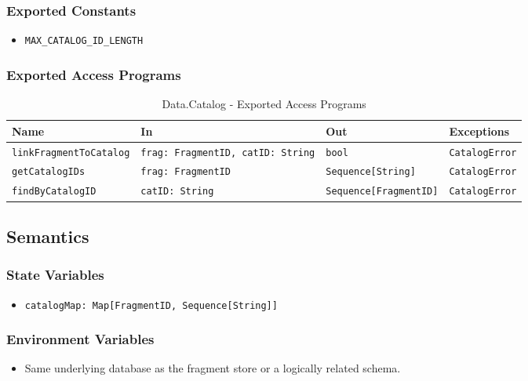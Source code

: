 \documentclass[12pt, titlepage]{article}
\begin{document}
\subsubsection{Exported Constants}
\begin{itemize}
    \item \texttt{MAX\_CATALOG\_ID\_LENGTH}
\end{itemize}

\subsubsection{Exported Access Programs}

\begin{table}[H]
\centering
\small
\caption{Data.Catalog - Exported Access Programs}
\begin{tabular}{p{4.2cm} p{3.8cm} p{3.5cm} p{2.5cm}}
\toprule
\textbf{Name} & \textbf{In} & \textbf{Out} & \textbf{Exceptions} \\
\midrule
\texttt{linkFragmentToCatalog} & \texttt{frag: FragmentID, catID: String} & \texttt{bool} & \texttt{CatalogError} \\
\texttt{getCatalogIDs} & \texttt{frag: FragmentID} & \texttt{Sequence[String]} & \texttt{CatalogError} \\
\texttt{findByCatalogID} & \texttt{catID: String} & \texttt{Sequence[FragmentID]} & \texttt{CatalogError} \\
\bottomrule
\end{tabular}
\end{table}

\subsection{Semantics}

\subsubsection{State Variables}
\begin{itemize}
    \item \texttt{catalogMap: Map[FragmentID, Sequence[String]]}
\end{itemize}

\subsubsection{Environment Variables}
\begin{itemize}
    \item Same underlying database as the fragment store or a logically related schema.
\end{itemize}
\end{document}
